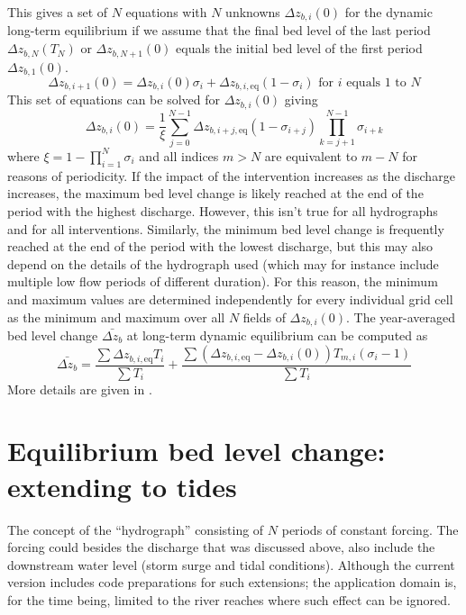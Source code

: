 This gives a set of $N$ equations with $N$ unknowns $\Delta z_{b,i}(0)$ for the dynamic long-term equilibrium if we assume that the final bed level of the last period $\Delta z_{b,N}(T_N)$ or $\Delta z_{b,N+1}(0)$ equals the initial bed level of the first period $\Delta z_{b,1}(0)$.
%
\begin{equation}
\Delta z_{b,i+1}(0) = \Delta z_{b,i}(0) \sigma_i + \Delta z_{b,i,\text{eq}} (1-\sigma_i) \text{ for $i$ equals 1 to $N$}
\label{Eq:zbiNPeriods}
\end{equation}
%
This set of equations can be solved for $\Delta z_{b,i}(0)$ giving
%
\begin{equation}
\Delta z_{b,i}(0) = \frac{1}{\xi} \sum_{j=0}^{N-1} \Delta z_{b,i+j,\text{eq}} (1-\sigma_{i+j}) \prod_{k=j+1}^{N-1} \sigma_{i+k}
\end{equation}
%
where $\xi = 1 - \prod_{i=1}^N \sigma_i$ and all indices $m>N$ are equivalent to $m-N$ for reasons of periodicity.
If the impact of the intervention increases as the discharge increases, the maximum bed level change is likely reached at the end of the period with the highest discharge.
However, this isn't true for all hydrographs and for all interventions.
Similarly, the minimum bed level change is frequently reached at the end of the period with the lowest discharge, but this may also depend on the details of the hydrograph used (which may for instance include multiple low flow periods of different duration).
For this reason, the minimum and maximum values are determined independently for every individual grid cell as the minimum and maximum over all $N$ fields of $\Delta z_{b,i}(0)$.
The year-averaged bed level change $\bar{\Delta z_b}$ at long-term dynamic equilibrium can be computed as
%
\begin{equation}
\bar{\Delta z_b} = \frac{\sum{\Delta z_{b,i,\text{eq}} T_i}}{\sum{T_i}} + \frac{\sum{(\Delta z_{b,i,\text{eq}} - \Delta z_{b,i}(0)) T_{m,i} (\sigma_i-1)}}{\sum{T_i}}
\label{Eq:zbMean}
\end{equation}
%
More details are given in \citet{JagersGiri2022}.


\section{Equilibrium bed level change: extending to tides}\label{Sec:Tides}

The concept of the ``hydrograph'' consisting of $N$ periods of constant forcing.
The forcing could besides the discharge that was discussed above, also include the downstream water level (storm surge and tidal conditions).
Although the current \dfastmi version includes code preparations for such extensions; the application domain is, for the time being, limited to the river reaches where such effect can be ignored.


